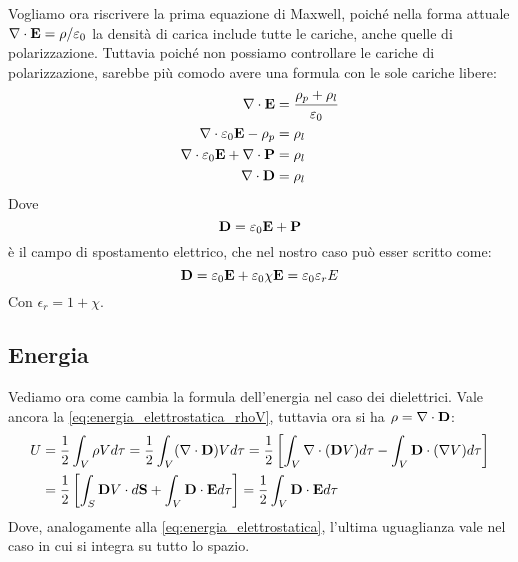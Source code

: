 Vogliamo ora riscrivere la prima equazione di Maxwell, poiché nella forma attuale $\nabla \cdot \mathbf E = \rho /\varepsilon_0$ la densità di carica include tutte le cariche, anche quelle di polarizzazione. Tuttavia poiché non possiamo controllare le cariche di polarizzazione, sarebbe più comodo avere una formula con le sole cariche libere:
\begin{align}
    \nabla \cdot \mathbf E     &= \frac{ \rho_p + \rho_l }{ \varepsilon_0 }  \\
    \nabla \cdot \varepsilon_0 \mathbf E - \rho_p &= \rho_l \\
    \nabla \cdot \varepsilon_0 \mathbf E + \nabla \cdot \mathbf P &= \rho_l \\
    \nabla \cdot \mathbf D &= \rho_l 
\end{align}
Dove 
\begin{equation}
    \mathbf D = \varepsilon_0 \mathbf E + \mathbf P
\end{equation}
è il campo di spostamento elettrico, che nel nostro caso può esser scritto come:
\begin{equation}
    \mathbf D = \varepsilon_0 \mathbf E + \varepsilon_0 \chi \mathbf E = \varepsilon_0 \varepsilon_r E
\end{equation}
Con $\epsilon_r = 1 + \chi $.


\subsection{Energia} %
\label{sub:energia}

Vediamo ora come cambia la formula dell'energia nel caso dei dielettrici.
Vale ancora la \ref{eq:energia_elettrostatica_rhoV}, tuttavia ora si ha $\rho = \nabla \cdot \mathbf D$:
\begin{align*} 
    U   &= \frac{ 1 }{ 2 } \int_V \rho V d\tau 
        = \frac{ 1 }{ 2 } \int_V (\nabla \cdot \mathbf D) V d\tau 
        = \frac{ 1 }{ 2 } \left [ \int_V \nabla \cdot (\mathbf DV) d\tau - \int_V \mathbf D \cdot (\nabla V) d\tau \right ] \\
        &= \frac{ 1 }{ 2 } \left [ \int_S \mathbf DV \cdot d\mathbf S + \int_V \mathbf D \cdot \mathbf E d\tau \right ]
        = \frac{ 1 }{ 2 } \int_V \mathbf D \cdot \mathbf E d\tau 
\end{align*}
Dove, analogamente alla \ref{eq:energia_elettrostatica}, l'ultima uguaglianza vale nel caso in cui si integra su tutto lo spazio.


